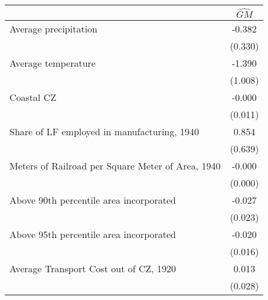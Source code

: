  \begin{tabular}{l*{1}{c}} \toprule
                &\multicolumn{1}{c}{$\widehat{GM}$}\\
\midrule
Average precipitation&   -0.382   \\
                &  (0.330)   \\
\addlinespace
Average temperature&   -1.390   \\
                &  (1.008)   \\
\addlinespace
Coastal CZ      &   -0.000   \\
                &  (0.011)   \\
\addlinespace
Share of LF employed in manufacturing, 1940&    0.854   \\
                &  (0.639)   \\
\addlinespace
Meters of Railroad per Square Meter of Area, 1940&   -0.000   \\
                &  (0.000)   \\
\addlinespace
Above 90th percentile area incorporated&   -0.027   \\
                &  (0.023)   \\
\addlinespace
Above 95th percentile area incorporated&   -0.020   \\
                &  (0.016)   \\
\addlinespace
Average Transport Cost out of CZ, 1920&    0.013   \\
                &  (0.028)   \\
       \bottomrule \end{tabular}
